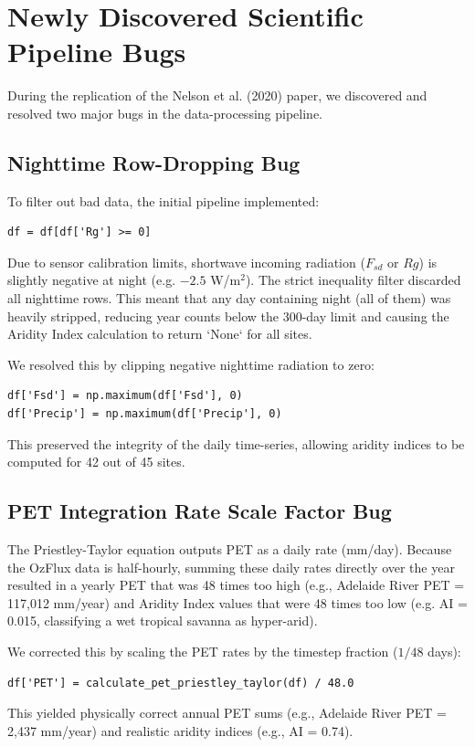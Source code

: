 \documentclass[11pt,a4paper]{article}
\begin{document}
\section{Newly Discovered Scientific Pipeline Bugs}
During the replication of the Nelson et al. (2020) paper, we discovered and resolved two major bugs in the data-processing pipeline.

\subsection{Nighttime Row-Dropping Bug}
To filter out bad data, the initial pipeline implemented:
\begin{verbatim}
df = df[df['Rg'] >= 0]
\end{verbatim}
Due to sensor calibration limits, shortwave incoming radiation ($F_{sd}$ or $Rg$) is slightly negative at night (e.g. $-2.5$ W/m$^2$). The strict inequality filter discarded all nighttime rows. This meant that any day containing night (all of them) was heavily stripped, reducing year counts below the 300-day limit and causing the Aridity Index calculation to return `None` for all sites.

We resolved this by clipping negative nighttime radiation to zero:
\begin{verbatim}
df['Fsd'] = np.maximum(df['Fsd'], 0)
df['Precip'] = np.maximum(df['Precip'], 0)
\end{verbatim}
This preserved the integrity of the daily time-series, allowing aridity indices to be computed for 42 out of 45 sites.

\subsection{PET Integration Rate Scale Factor Bug}
The Priestley-Taylor equation outputs PET as a daily rate (mm/day). Because the OzFlux data is half-hourly, summing these daily rates directly over the year resulted in a yearly PET that was 48 times too high (e.g., Adelaide River PET = 117,012 mm/year) and Aridity Index values that were 48 times too low (e.g. AI = 0.015, classifying a wet tropical savanna as hyper-arid).

We corrected this by scaling the PET rates by the timestep fraction ($1/48$ days):
\begin{verbatim}
df['PET'] = calculate_pet_priestley_taylor(df) / 48.0
\end{verbatim}
This yielded physically correct annual PET sums (e.g., Adelaide River PET = 2,437 mm/year) and realistic aridity indices (e.g., AI = 0.74).
\end{document}

